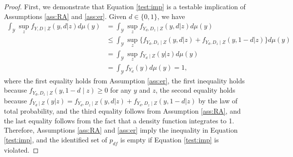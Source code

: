 \documentclass[12pt]{article}
\theoremstyle{plain}
\theoremstyle{definition}
\theoremstyle{remark}
\begin{document}
\begin{proof}
   First, we demonstrate that Equation \eqref{test:imp} is a testable implication of Assumptions \ref{ass:RA} and \ref{ass:er}. Given $d \in \{0, 1\}$, we have
\begin{equation*}
    \begin{aligned}
        \int_{\mathcal Y} \sup _z f_{Y, D \mid Z}(y, d \vert z) d \mu(y) &= \int_{\mathcal Y} \sup _z f_{Y_d, D_z \mid Z}(y, d \vert z) d \mu(y) \\
        & \leq \int_{\mathcal Y} \sup _z \{f_{Y_d, D_z \mid Z}(y, d \vert z)+f_{Y_d, D_z \mid Z}(y, 1-d \vert z)\} d \mu(y)\\
        &= \int_{\mathcal Y} \sup _z f_{Y_d \mid Z}(y \vert z) d \mu(y) \\
        &= \int_{\mathcal Y} f_{Y_d}(y) d \mu(y) = 1,
    \end{aligned}
\end{equation*}
where the first equality holds from  Assumption \ref{ass:er}, the first inequality holds because $f_{Y_d, D_z \mid Z}(y, 1-d \mid z) \geq 0$ for any $y$ and $z$, the second equality holds because $f_{Y_d \mid Z}(y \vert z)=f_{Y_d, D_z \mid Z}(y, d \vert z)+f_{Y_d, D_z \mid Z}(y, 1-d \vert z)$ by the law of total probability, and the third equality follows from Assumption \ref{ass:RA}, and the last equality follows from the fact that a density function integrates to 1. Therefore, Assumptions \ref{ass:RA} and \ref{ass:er} imply the inequality in Equation \eqref{test:imp}, and the identified set of $p_{df}$ is empty if Equation \eqref{test:imp} is violated.


\end{proof}
\end{document}
